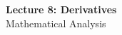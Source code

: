 \documentclass[12pt]{article}
\begin{document}
\begin{center}
  {\LARGE\bfseries Lecture 8: Derivatives}\\[0.25em]
  {\large Mathematical Analysis}\\[0.15em]
\end{center}
\end{document}
